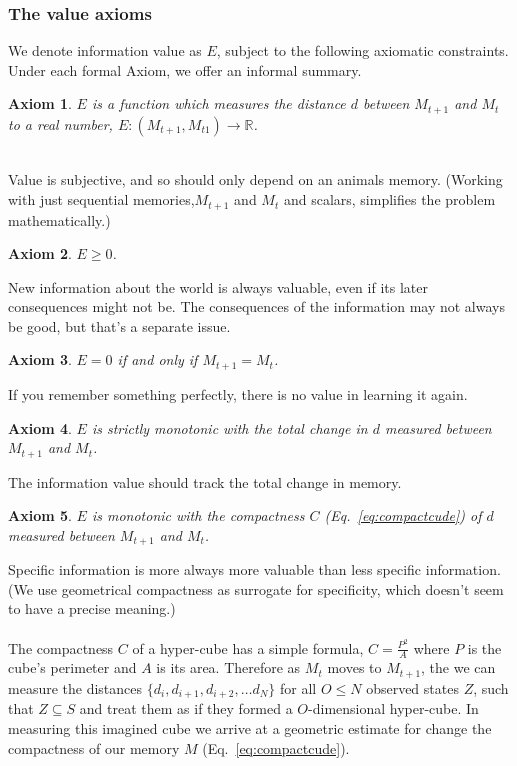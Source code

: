\documentclass[9pt,twocolumn,twoside]{pnas-new}
\newtheorem{axiom}{Axiom}
\begin{document}
\subsubsection*{The value axioms}
We denote information value as $E$, subject to the following axiomatic constraints. Under each formal Axiom, we offer an informal summary.

\begin{axiom} 
    $E$ is a function which measures the distance $d$ between $M_{t+1}$ and $M_{t}$ to a real number, $E: (M_{t+1}, M_{t1}) \rightarrow \mathbb{R}$.
    \label{ax:1}
\end{axiom} \\
\noindent
Value is subjective, and so should only depend on an animals memory. (Working with just sequential memories,$M_{t+1}$ and $M_{t}$ and scalars, simplifies the problem mathematically.)

\begin{axiom}
    $E \geq 0$.
    \label{ax:2}
\end{axiom}
\noindent
New information about the world is always valuable, even if its later consequences might not be. The consequences of the information may not always be good, but that's a separate issue.

\begin{axiom}
    $E = 0$ if and only if $M_{t+1} = M_{t}$.
    \label{ax:3}
\end{axiom}
\noindent
If you remember something perfectly, there is no value in learning it again.
 
\begin{axiom}
    $E$ is strictly monotonic with the total change in $d$ measured between $M_{t+1}$ and $M_{t}$.
    \label{ax:4}
\end{axiom}
\noindent
The information value should track the total change in memory. 

\begin{axiom}
    $E$ is monotonic with the compactness $C$ (Eq.~\ref{eq:compactcude}) of $d$ measured between $M_{t+1}$ and $M_{t}$.
    \label{ax:5}
\end{axiom}
\noindent
Specific information is more always more valuable than less specific information. (We use geometrical compactness as surrogate for specificity, which doesn't seem to have a precise meaning.)
\\ \\
The compactness $C$ of a hyper-cube has a simple formula, $C = \frac{P^2}{A}$ where $P$ is the cube's perimeter and $A$ is its area. Therefore as $M_{t}$ moves to $M_{t+1}$, the we can measure the distances $\{d_i, d_{i+1}, d_{i+2},\ldots d_{N}\}$ for all $O \leq N$ observed states $Z$, such that $Z \subseteq S$ and treat them as if they formed a $O$-dimensional hyper-cube. In measuring this imagined cube we arrive at a geometric estimate for change the compactness of our memory $M$ (Eq.~\ref{eq:compactcude}).
\end{document}
